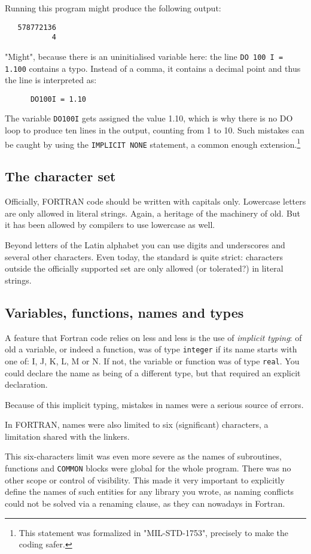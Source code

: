 Running this program might produce the following output:
\begin{verbatim}
   578772136
           4
\end{verbatim}
"Might", because there is an uninitialised variable here: the line \verb+DO 100 I = 1.100+
contains a typo. Instead of a comma, it contains a decimal point and thus the line is
interpreted as:
\begin{verbatim}
      DO100I = 1.10
\end{verbatim}
The variable \verb+DO100I+ gets assigned the value 1.10, which is why there is no DO loop
to produce ten lines in the output, counting from 1 to 10. Such mistakes can be caught
by using the \verb+IMPLICIT NONE+ statement, a common enough extension.\cite{drFortranImplicit}\footnote{This statement
was formalized in "MIL-STD-1753", precisely to make the coding safer.}


\subsection{The character set}
Officially, FORTRAN code should be written with capitals only. Lowercase letters are only
allowed in literal strings. Again, a heritage of the machinery of old. But it has been
allowed by compilers to use lowercase as well.

Beyond letters of the Latin alphabet you can use digits and underscores and several other characters.
Even today, the standard is quite strict: characters outside the officially supported set are only
allowed (or tolerated?) in literal strings.


\subsection{Variables, functions, names and types}
A feature that Fortran code relies on less and less is the use of \emph{implicit typing}: of old
a variable, or indeed a function, was of type \verb+integer+ if its name starts with one of: I, J, K, L, M or N.
If not, the variable or function was of type \verb+real+. You could declare the name as being of a different type, but
that required an explicit declaration.

Because of this implicit typing, mistakes in names were a serious source of errors.

In FORTRAN, names were also limited to six (significant) characters, a limitation shared with the linkers.

This six-characters limit was even more severe as the names of subroutines, functions and \verb+COMMON+ blocks
were global for the whole program. There was no other scope or control of visibility. This made it
very important to explicitly define the names of such entities for any library you wrote, as naming conflicts
could not be solved via a renaming clause, as they can nowadays in Fortran.

